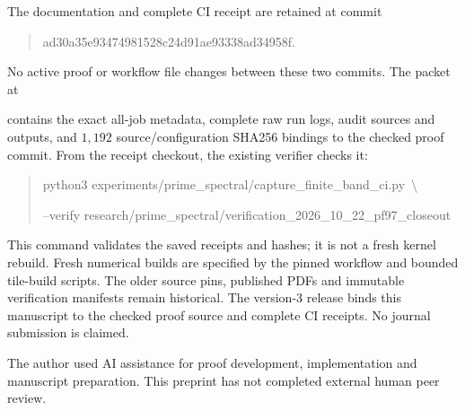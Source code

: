 \documentclass[11pt]{amsart}
\begin{document}
The documentation and complete CI receipt are retained at commit
\begin{quote}\small\ttfamily
ad30a35e93474981528c24d91ae93338ad34958f.
\end{quote}
No active proof or workflow file changes between these two commits.
The packet at
\begin{quote}\small\raggedright
{}
\end{quote}
contains the exact all-job metadata, complete raw run logs, audit sources and
outputs, and $1{,}192$ source/configuration SHA256 bindings to the checked
proof commit. From the receipt checkout, the existing verifier checks it:
\begin{quote}\small\ttfamily\raggedright
python3 experiments/prime\_spectral/capture\_finite\_band\_ci.py\ \textbackslash\par
\hspace*{1em}--verify research/prime\_spectral/verification\_2026\_10\_22\_pf97\_closeout
\end{quote}
This command validates the saved receipts and hashes; it is not a fresh
kernel rebuild. Fresh numerical builds
are specified by the pinned workflow and bounded tile-build scripts.
The older source pins, published PDFs and immutable verification manifests
remain historical. The version-3 release binds this manuscript to the
checked proof source and complete CI receipts. No journal submission is claimed.

The author used AI assistance for proof development, implementation and manuscript
preparation. This preprint has not completed external human peer review.
\end{document}
